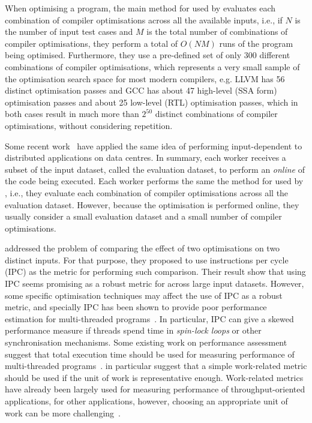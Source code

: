 When optimising a program, the main method for {\itercomp} used by \cite{chen10,chen12a} evaluates each combination of compiler optimisations across all the available inputs, i.e., if $N$ is the number of input test cases and $M$ is the total number of combinations of compiler optimisations, they perform a total of $O(NM)$ runs of the program being optimised.
Furthermore, they use a pre-defined set of only 300 different combinations of compiler optimisations, which represents a very small sample of the optimisation search space for most modern compilers, e.g.
LLVM has 56 distinct optimisation passes and GCC has about 47 high-level (SSA form) optimisation passes and about 25 low-level (RTL) optimisation passes, which in both cases result in much more than $2^{50}$ distinct combinations of compiler optimisations, without considering repetition.

Some recent work~\citep{chen12b,fang15} have applied the same idea of performing input-dependent {\itercomp} to distributed applications on data centres.
In summary, each worker receives a subset of the input dataset, called the evaluation dataset, to perform an \textit{online} {\itercomp} of the code being executed.
Each worker performs the same the method for {\itercomp} used by \cite{chen10,chen12a}, i.e., they evaluate each combination of compiler optimisations across all the evaluation dataset.
However, because the optimisation is performed online, they usually consider a small evaluation dataset and a small number of compiler optimisations.

\cite{fursin07} addressed the problem of comparing the effect of two optimisations on two distinct inputs.
For that purpose, they proposed to use instructions per cycle (IPC) as the metric for performing such comparison.
Their result show that using IPC seems promising as a robust metric for {\itercomp} across large input datasets.
However, some specific optimisation techniques may affect the use of IPC as a robust metric, and specially IPC has been shown to provide poor performance estimation for multi-threaded programs~\citep{alameldeen06,eyerman08}.
In particular, IPC can give a skewed performance measure if threads spend time in \textit{spin-lock loops} or other synchronisation mechanisms. 
Some existing work on performance assessment suggest that total execution time should be used for measuring performance of multi-threaded programs~\citep{alameldeen06,eyerman08}.
\cite{alameldeen06} in particular suggest that a simple work-related metric should be used if the unit of work is representative enough.
Work-related metrics have already been largely used for measuring performance of throughput-oriented applications, for other applications, however, choosing an appropriate unit of work can be more challenging~\citep{alameldeen06}.

